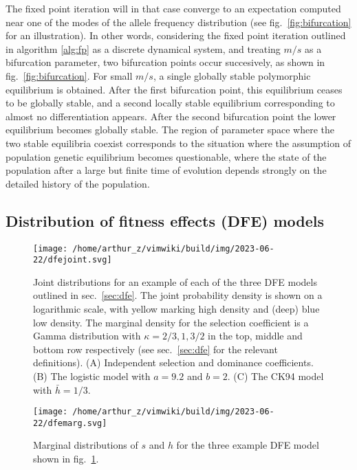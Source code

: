 \documentclass[
  11pt,
]{article}
\begin{document}
The fixed point iteration will in that case converge to an expectation
computed near one of the modes of the allele frequency distribution (see
fig.~\ref{fig:bifurcation} for an illustration). In other words,
considering the fixed point iteration outlined in algorithm
\autoref{alg:fp} as a discrete dynamical system, and treating \(m/s\) as
a bifurcation parameter, two bifurcation points occur succesively, as
shown in fig.~\ref{fig:bifurcation}. For small \(m/s\), a single
globally stable polymorphic equilibrium is obtained. After the first
bifurcation point, this equilibrium ceases to be globally stable, and a
second locally stable equilibrium corresponding to almost no
differentiation appears. After the second bifurcation point the lower
equilibrium becomes globally stable. The region of parameter space where
the two stable equilibria coexist corresponds to the situation where the
assumption of population genetic equilibrium becomes questionable, where
the state of the population after a large but finite time of evolution
depends strongly on the detailed history of the population.

\hypertarget{distribution-of-fitness-effects-dfe-models}{%
\subsection{\texorpdfstring{Distribution of fitness effects (DFE) models
\label{sec:dfe}}{Distribution of fitness effects (DFE) models }}\label{distribution-of-fitness-effects-dfe-models}}

\begin{figure}
\centering
\texttt{[image: /home/arthur\_z/vimwiki/build/img/2023-06-22/dfejoint.svg]}
\caption{Joint distributions for an example of each of the three DFE
models outlined in sec.~\ref{sec:dfe}. The joint probability density is
shown on a logarithmic scale, with yellow marking high density and
(deep) blue low density. The marginal density for the selection
coefficient is a Gamma distribution with \(\kappa = 2/3, 1, 3/2\) in the
top, middle and bottom row respectively (see sec.~\ref{sec:dfe} for the
relevant definitions). (A) Independent selection and dominance
coefficients. (B) The logistic model with \(a=9.2\) and \(b=2\). (C) The
CK94 model with \(\bar{h} = 1/3\). \label{fig:dfejoint}}
\end{figure}

\begin{figure}
\centering
\texttt{[image: /home/arthur\_z/vimwiki/build/img/2023-06-22/dfemarg.svg]}
\caption{Marginal distributions of \(s\) and \(h\) for the three example
DFE model shown in fig.~\ref{fig:dfejoint}. \label{fig:dfemarg}}
\end{figure}
\end{document}
